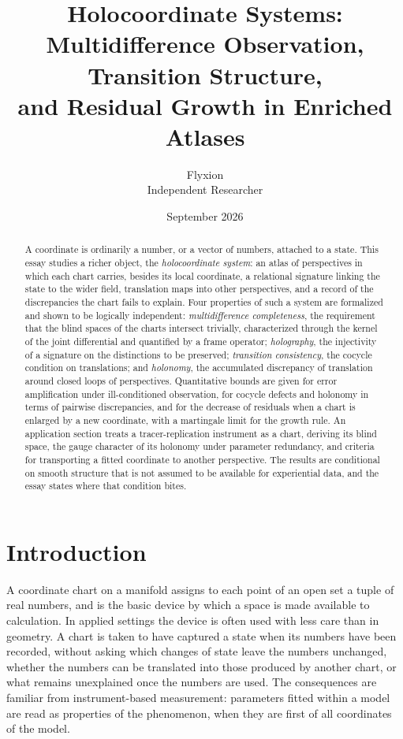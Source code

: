 \documentclass[11pt]{article}
\title{Holocoordinate Systems:\\ Multidifference Observation, Transition Structure,\\ and Residual Growth in Enriched Atlases}
\author{Flyxion\\ \small Independent Researcher}
\date{September 2026}
\theoremstyle{remark}
\begin{document}
\maketitle

\begin{abstract}
\noindent A coordinate is ordinarily a number, or a vector of numbers, attached to a state. This essay studies a richer object, the \emph{holocoordinate system}: an atlas of perspectives in which each chart carries, besides its local coordinate, a relational signature linking the state to the wider field, translation maps into other perspectives, and a record of the discrepancies the chart fails to explain. Four properties of such a system are formalized and shown to be logically independent: \emph{multidifference completeness}, the requirement that the blind spaces of the charts intersect trivially, characterized through the kernel of the joint differential and quantified by a frame operator; \emph{holography}, the injectivity of a signature on the distinctions to be preserved; \emph{transition consistency}, the cocycle condition on translations; and \emph{holonomy}, the accumulated discrepancy of translation around closed loops of perspectives. Quantitative bounds are given for error amplification under ill-conditioned observation, for cocycle defects and holonomy in terms of pairwise discrepancies, and for the decrease of residuals when a chart is enlarged by a new coordinate, with a martingale limit for the growth rule. An application section treats a tracer-replication instrument as a chart, deriving its blind space, the gauge character of its holonomy under parameter redundancy, and criteria for transporting a fitted coordinate to another perspective. The results are conditional on smooth structure that is not assumed to be available for experiential data, and the essay states where that condition bites.
\end{abstract}

\section{Introduction}

A coordinate chart on a manifold assigns to each point of an open set a tuple of real numbers, and is the basic device by which a space is made available to calculation. In applied settings the device is often used with less care than in geometry. A chart is taken to have captured a state when its numbers have been recorded, without asking which changes of state leave the numbers unchanged, whether the numbers can be translated into those produced by another chart, or what remains unexplained once the numbers are used. The consequences are familiar from instrument-based measurement: parameters fitted within a model are read as properties of the phenomenon, when they are first of all coordinates of the model.
\end{document}
